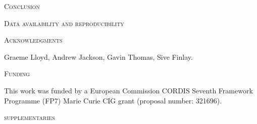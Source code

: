 \documentclass[12pt,letterpaper]{article}
\renewcommand{\section}[1]{%
\bigskip
\begin{center}
\begin{Large}
\normalfont\scshape #1
\medskip
\end{Large}
\end{center}}
\begin{document}

%
%

\section{Conclusion}



\section{Data availability and reproducibility}

\section{Acknowledgments}
Graeme Lloyd, Andrew Jackson, Gavin Thomas, Sive Finlay.

\section{Funding} %
This work was funded by a European Commission CORDIS Seventh Framework Programme (FP7) Marie Curie CIG grant (proposal number: 321696).





\section{supplementaries}
\end{document}
